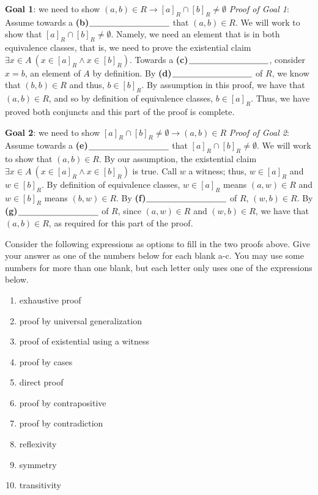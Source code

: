\documentclass[12pt, oneside]{article}
\begin{document}
\begin{enumerate}
{\bf Goal 1}: we need to show $(a,b) \in R \to [a]_R\cap [b]_R \neq \emptyset$
{\it Proof of Goal 1}: Assume towards a \textbf{(b)}$\underline{\phantom{\hspace{1.3in}}}$ 
that $(a,b) \in R$. We will work to show
that $[a]_R\cap [b]_R \neq \emptyset$. Namely, we need an element that is in both equivalence classes, that is, we
 need to prove the existential claim $\exists x \in A ~(x \in [a]_{R} \land x \in [b]_{R})$. 
 Towards a \textbf{(c)}$\underline{\phantom{\hspace{1.3in}}}$, consider $x = b$, 
 an element of $A$ by definition. By \textbf{(d)}$\underline{\phantom{\hspace{1.3in}}}$  of $R$, we know that $(b,b) \in R$ 
 and thus, $b \in [b]_{R}$.
 By assumption in this proof, we have that $(a,b) \in R$, and so by  definition of equivalence classes, $b \in [a]_R$.
 Thus, we have proved both conjuncts and this part of the proof is complete.
 
{\bf Goal 2}: we need to show $[a]_R\cap [b]_R \neq \emptyset \to (a,b) \in R $
{\it Proof of Goal 2}: Assume towards a \textbf{(e)}$\underline{\phantom{\hspace{1.3in}}}$ 
that $[a]_R\cap [b]_R \neq \emptyset $. We will work to show
that $(a,b) \in R$. By our assumption, the existential claim $\exists x \in A ~(x \in [a]_{R} \land x \in [b]_{R})$
is true. Call $w$ a witness; thus, $w \in [a]_R$ and $w \in [b]_R$. 
By  definition of equivalence classes, $w \in [a]_R$ means $(a,w) \in R$ and $w \in [b]_R$ means $(b,w) \in R$.
By \textbf{(f)}$\underline{\phantom{\hspace{1.3in}}}$  of $R$, $(w,b) \in R$. By 
\textbf{(g)}$\underline{\phantom{\hspace{1.3in}}}$ of $R$, since $(a,w) \in R$ and $(w,b) \in R$, we have that
$(a,b) \in R$, as required for  this part of the proof.
 
Consider the following expressions as options to fill in the two proofs above. Give your answer as one of the numbers below for each blank a-c. You may use some numbers for more than one blank, but each letter only uses one of the expressions below.

\begin{multicols}{2}
\begin{enumerate}[label=\roman*]
\item exhaustive proof
\item proof by universal generalization
\item proof of existential using a witness
\item proof by cases
\item direct proof
\item proof by contrapositive
\item proof by contradiction
\item reflexivity
\item symmetry
\item transitivity
\end{enumerate}
\end{multicols}


\end{enumerate}
\end{document}
